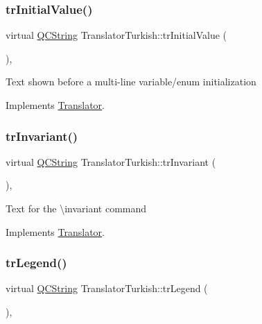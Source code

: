 \subsubsection{\texorpdfstring{trInitialValue()}{trInitialValue()}}
{\footnotesize\ttfamily virtual \mbox{\hyperlink{class_q_c_string}{Q\+C\+String}} Translator\+Turkish\+::tr\+Initial\+Value (\begin{DoxyParamCaption}{ }\end{DoxyParamCaption})\hspace{0.3cm}{\ttfamily [inline]}, {\ttfamily [virtual]}}

Text shown before a multi-\/line variable/enum initialization 

Implements \mbox{\hyperlink{class_translator}{Translator}}.

\mbox{\label{class_translator_turkish_aef2213cd89070c7a6b12297043092123}} 
\subsubsection{\texorpdfstring{trInvariant()}{trInvariant()}}
{\footnotesize\ttfamily virtual \mbox{\hyperlink{class_q_c_string}{Q\+C\+String}} Translator\+Turkish\+::tr\+Invariant (\begin{DoxyParamCaption}{ }\end{DoxyParamCaption})\hspace{0.3cm}{\ttfamily [inline]}, {\ttfamily [virtual]}}

Text for the \textbackslash{}invariant command 

Implements \mbox{\hyperlink{class_translator}{Translator}}.

\mbox{\label{class_translator_turkish_a444e599398bb694de5432ed54d673dd4}} 
\subsubsection{\texorpdfstring{trLegend()}{trLegend()}}
{\footnotesize\ttfamily virtual \mbox{\hyperlink{class_q_c_string}{Q\+C\+String}} Translator\+Turkish\+::tr\+Legend (\begin{DoxyParamCaption}{ }\end{DoxyParamCaption})\hspace{0.3cm}{\ttfamily [inline]}, {\ttfamily [virtual]}}

